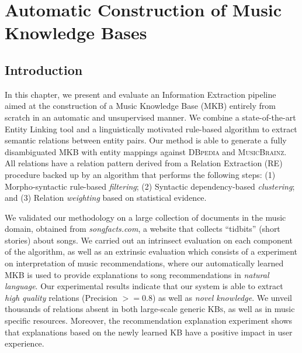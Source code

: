 
\chapter{Automatic Construction of Music Knowledge Bases}
\label{sec:kb}

\section{Introduction}\label{sec:kb:introduction}

In this chapter, we present and evaluate an Information Extraction pipeline aimed at the construction of a Music Knowledge Base (\textsc{MKB}) entirely from scratch in an automatic and unsupervised manner.
We combine a state-of-the-art Entity Linking tool and a linguistically motivated rule-based algorithm to extract semantic relations between entity pairs. 
Our method is able to generate a fully disambiguated \textsc{MKB} with entity mappings against \textsc{DBpedia} and \textsc{MusicBrainz}. All relations have a relation pattern derived from a Relation Extraction (\textsc{RE}) procedure backed up by an algorithm that performs the following steps: (1) Morpho-syntactic rule-based \textit{filtering}; (2) Syntactic dependency-based \textit{clustering}; and (3) Relation \textit{weighting} based on statistical evidence. 

We validated our methodology on a large collection of documents in the music domain, obtained from \textit{songfacts.com}, a website that collects ``tidbits'' (short stories) about songs.
We carried out an intrinsect evaluation on each component of the algorithm, as well as an extrinsic evaluation which consists of a experiment on interpretation of music recommendations, where our automatically learned \textsc{MKB} is used to provide explanations to song recommendations in \textit{natural language}.
Our experimental results indicate that our system is able to extract \textit{high quality} relations (Precision $>= 0.8$) as well as \textit{novel knowledge}. We unveil thousands of relations absent in both large-scale generic \textsc{KBs}, as well as in music specific resources. Moreover, the recommendation explanation experiment shows that explanations based on the newly learned \textsc{KB} have a positive impact in user experience.


